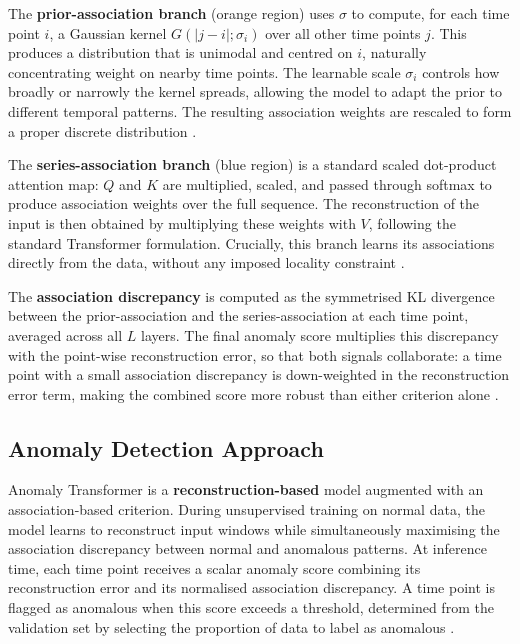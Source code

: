 \documentclass[twoside,11pt,openright]{report}
\begin{document}
The \textbf{prior-association branch} (orange region) uses $\sigma$ to compute, for
each time point $i$, a Gaussian kernel $G(|j - i|; \sigma_i)$ over all other time
points $j$. This produces a distribution that is unimodal and centred on $i$,
naturally concentrating weight on nearby time points. The learnable scale $\sigma_i$
controls how broadly or narrowly the kernel spreads, allowing the model to adapt the
prior to different temporal patterns. The resulting association weights are rescaled
to form a proper discrete distribution \citep{anomalytransformer2022}.

The \textbf{series-association branch} (blue region) is a standard scaled
dot-product attention map: $Q$ and $K$ are multiplied, scaled, and passed through
softmax to produce association weights over the full sequence. The reconstruction of
the input is then obtained by multiplying these weights with $V$, following the
standard Transformer formulation. Crucially, this branch learns its associations
directly from the data, without any imposed locality constraint
\citep{anomalytransformer2022}.

The \textbf{association discrepancy} is computed as the symmetrised KL divergence
between the prior-association and the series-association at each time point, averaged
across all $L$ layers. The final anomaly score multiplies this discrepancy with the
point-wise reconstruction error, so that both signals collaborate: a time point with
a small association discrepancy is down-weighted in the reconstruction error term,
making the combined score more robust than either criterion alone
\citep{anomalytransformer2022}.



\subsection{Anomaly Detection Approach}

Anomaly Transformer is a \textbf{reconstruction-based} model augmented with an
association-based criterion. During unsupervised training on normal data, the model
learns to reconstruct input windows while simultaneously maximising the association
discrepancy between normal and anomalous patterns. At
inference time, each time point receives a scalar anomaly score combining its
reconstruction error and its normalised association discrepancy. A time point is
flagged as anomalous when this score exceeds a threshold, determined from the
validation set by selecting the proportion of data to label as anomalous
\citep{anomalytransformer2022}.
\end{document}
